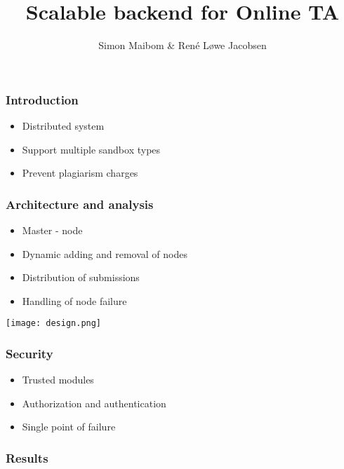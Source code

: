 \documentclass[12pt,t]{beamer}
\title{Scalable backend for Online TA}
\subtitle{}
\author{Simon Maibom \& René Løwe Jacobsen}
\institute{Department of Computer Science}
\begin{document}
\frame[plain]{\titlepage}
\begin{frame}
\frametitle{Introduction}
\begin{itemize}
    \item Distributed system
    \item Support multiple sandbox types
    \item Prevent plagiarism charges
\end{itemize}
\end{frame}
\begin{frame}
\frametitle{Architecture and analysis}
\begin{itemize}
    \item Master - node
    \item Dynamic adding and removal of nodes
    \item Distribution of submissions
    \item Handling of node failure
\end{itemize}
\texttt{[image: design.png]}
\end{frame}
\begin{frame}
\frametitle{Security}
\begin{itemize}
    \item Trusted modules
    \item Authorization and authentication
    \item Single point of failure
\end{itemize}
\end{frame}
\begin{frame}
\frametitle{Results}
\end{frame}
\end{document}
